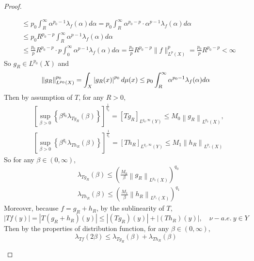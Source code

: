 \begin{proof}
\begin{enumerate}[label=(\Roman*)]
\begin{equation*}
\begin{aligned}
				&\leq p_0 \int_R^{\infty} \alpha^{p_0-1} \lambda_f(\alpha) d \alpha = p_0 \int_R^{\infty} \alpha^{p_0-p} \cdot \alpha^{p-1} \lambda_f(\alpha) d \alpha\\
				&\leq  p_0 R^{p_0-p} \int_R^{\infty} \alpha^{p-1} \lambda_f(\alpha) d \alpha \\
				&\leq \frac{p_0}{p} R^{p_0-p} \cdot p \int_0^{\infty} \alpha^{p-1} \lambda_f(\alpha) d \alpha = \frac{p_0}{p} R^{p_0-p}\|f\|_{L^p(X)}^p=\frac{p_0}{p} R^{p_0-p}<\infty
			\end{aligned}
		\end{equation*}
		So $g_R \in L^{p_0}(X)$ and
		\begin{equation*}
		 	\left\lVert g_R\right\lVert_{L^{p_0}(X)}^{p_0} = \int_X\left|g_R(x)\right|^{p_0} d \mu(x) \leq p_0 \int_R^{\infty} \alpha^{p_0-1} \lambda_f(\alpha) d \alpha
		\end{equation*}
		Then by assumption of $T$, for any $R > 0$,
		\begin{equation*}
			\begin{aligned}
				& {\left[\sup _{\beta>0}\left\{\beta^{q_0} \lambda_{T g_R}(\beta)\right\}\right]^{\frac{1}{q_0}}=\left[T g_R\right]_{L^{q_0, \infty}(Y)} \leq M_0\left\|g_R\right\|_{L^{p_0}(X)},} \\
				& {\left[\sup _{\beta>0}\left\{\beta^{q_1} \lambda_{T h_R}(\beta)\right\}\right]^{\frac{1}{q_1}}=\left[T h_R\right]_{L^{q_1, \infty}(Y)} \leq M_1\left\|h_R\right\|_{L^{p_1}(X)}}
			\end{aligned}
		\end{equation*}
		So for any $\beta \in (0,\infty)$,
		\begin{equation*}
			\begin{aligned}
				& \lambda_{T g_R}(\beta) \leq\left(\frac{M_0}{\beta}\left\|g_R\right\|_{L^{p_0}(X)}\right)^{q_0} \\
				& \lambda_{T h_R}(\beta) \leq\left(\frac{M_1}{\beta}\left\|h_R\right\|_{L^{p_1}(X)}\right)^{q_1}
			\end{aligned}
		\end{equation*}
		Moreover, because $f=g_R+h_R$, by the sublinearity of $T$,
		\begin{equation*}
			|T f(y)|=\left|T\left(g_R+h_R\right)(y)\right| \leq\left|\left(T g_R\right)(y)\right|+\left|\left(T h_R\right)(y)\right|, \quad \nu-a.e.~ y \in Y
		\end{equation*}
		Then by the properties of distribution function, for any $\beta \in (0,\infty)$,
		\begin{equation*}
			\lambda_{T f}(2 \beta) \leq \lambda_{T g_R}(\beta)+\lambda_{T h_R}(\beta)

\end{equation*}
\end{enumerate}
\end{proof}
